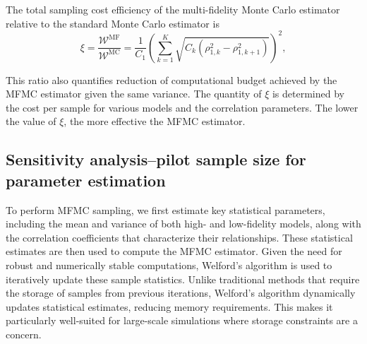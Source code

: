 The total sampling cost efficiency of the multi-fidelity Monte Carlo estimator relative to the standard Monte Carlo estimator is
%
\begin{equation}\label{eq:MFMC_sampling_cost_efficiency}
    \xi = \frac{\mathcal{W}^\text{MF}}{\mathcal{W}^\text{MC}} = \frac{1}{C_1} \left(\sum_{k=1}^K\sqrt{C_k\left(\rho_{1,k}^2 - \rho_{1,k+1}^2\right)}\right)^2,
\end{equation}
%

This ratio also quantifies reduction of computational budget achieved by the MFMC estimator given the same variance. The quantity of $\xi$ is determined by the cost per sample for various models and the correlation parameters. The lower the value of $\xi$, the more effective the MFMC estimator.


\subsection{Sensitivity analysis--pilot sample size for parameter estimation}\label{sec:Parameter_Estimation}

To perform MFMC sampling, we first estimate key statistical parameters, including the mean and variance of both high- and low-fidelity models, along with the correlation coefficients that characterize their relationships. These statistical estimates are then used to compute the MFMC estimator. Given the need for robust and numerically stable computations, Welford's algorithm \cite{Welford:1962} is used to iteratively update these sample statistics. Unlike traditional methods that require the storage of samples from previous iterations, Welford’s algorithm dynamically updates statistical estimates, reducing memory requirements. This makes it particularly well-suited for large-scale simulations where storage constraints are a concern.

